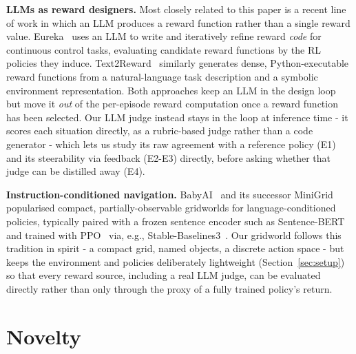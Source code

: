 \documentclass[conference]{IEEEtran}
\begin{document}
\textbf{LLMs as reward designers.} Most closely related to this paper
is a recent line of work in which an LLM produces a reward function
rather than a single reward value. Eureka~\cite{ma2024eureka} uses an
LLM to write and iteratively refine reward \emph{code} for continuous
control tasks, evaluating candidate reward functions by the RL policies
they induce. Text2Reward~\cite{xie2024text2reward} similarly generates
dense, Python-executable reward functions from a natural-language task
description and a symbolic environment representation. Both approaches
keep an LLM in the design loop but move it \emph{out} of the
per-episode reward computation once a reward function has been
selected. Our LLM judge instead stays in the loop at inference
time - it scores each situation directly, as a rubric-based judge
rather than a code generator - which lets us study its raw agreement
with a reference policy (E1) and its steerability via feedback (E2-E3)
directly, before asking whether that judge can be distilled away (E4).

\textbf{Instruction-conditioned navigation.} BabyAI~\cite{
chevalierboisvert2019babyai} and its successor
MiniGrid~\cite{chevalierboisvert2023minigrid} popularised compact,
partially-observable gridworlds for language-conditioned policies,
typically paired with a frozen sentence encoder such as
Sentence-BERT~\cite{reimers2019sbert} and trained with PPO~\cite{
schulman2017ppo} via, e.g., Stable-Baselines3~\cite{raffin2021sb3}. Our
gridworld follows this tradition in spirit - a compact grid, named
objects, a discrete action space - but keeps the environment and
policies deliberately lightweight (Section~\ref{sec:setup}) so that
every reward source, including a real LLM judge, can be evaluated
directly rather than only through the proxy of a fully trained policy's
return.

\section{Novelty}
\label{sec:novelty}
\end{document}
